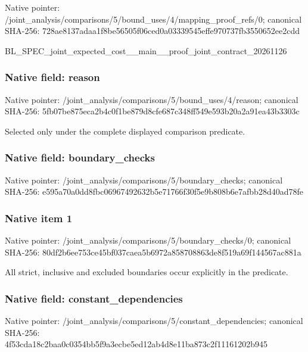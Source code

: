 \documentclass[10pt,a4paper]{article}
\begin{document}
Native pointer: /joint\_analysis/comparis\allowbreak{}ons/5/bound\_uses/4/mappi\allowbreak{}ng\_proof\_refs/0; canonical SHA-256: 728ae8137adaa1f8be56505f\allowbreak{}06ced0a03339545effe97073\allowbreak{}7fb3550652ee2cdd


BL\_SPEC\_joint\_expected\_c\allowbreak{}ost\_\_main\_\_proof\_joint\_c\allowbreak{}ontract\_20261126


\subsubsection{Native field: reason}


Native pointer: /joint\_analysis/comparis\allowbreak{}ons/5/bound\_uses/4/reaso\allowbreak{}n; canonical SHA-256: 5fb07be875eca2b4c0f1be87\allowbreak{}9d8cfe687c348ff549e593b2\allowbreak{}0a2a91ea43b3303c


Selected only under the complete displayed comparison predicate.


\subsubsection{Native field: boundary\_checks}


Native pointer: /joint\_analysis/comparis\allowbreak{}ons/5/boundary\_checks; canonical SHA-256: e595a70a0dd8fbc069674926\allowbreak{}32b5e71766f30f5e9b808b6e\allowbreak{}7afbb28d40ad78fe



\subsubsection{Native item 1}


Native pointer: /joint\_analysis/comparis\allowbreak{}ons/5/boundary\_checks/0; canonical SHA-256: 80df2b6ee753ce45bf037cae\allowbreak{}a5b6972a858708863de8f519\allowbreak{}a69f144567ac881a


All strict, inclusive and excluded boundaries occur explicitly in the predicate.


\subsubsection{Native field: constant\_dependencies}


Native pointer: /joint\_analysis/comparis\allowbreak{}ons/5/constant\_dependenc\allowbreak{}ies; canonical SHA-256: 4f53cda18c2baa0c0354bb5f\allowbreak{}9a3ecbe5ed12ab4d8e11ba87\allowbreak{}3c2f11161202b945
\end{document}
